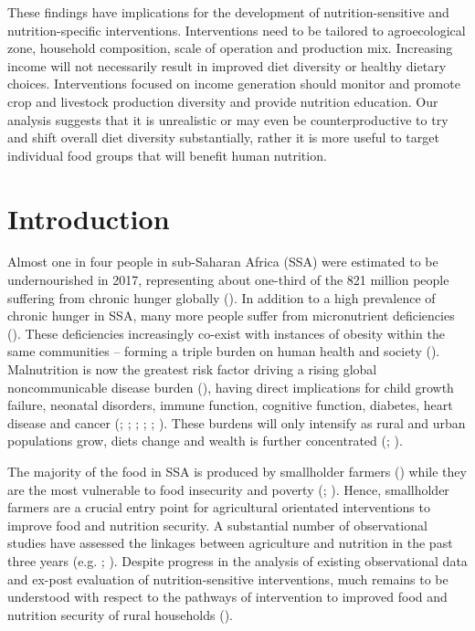 These findings have implications for the development of nutrition-sensitive and nutrition-specific interventions. Interventions need to be tailored to agroecological zone, household composition, scale of operation and production mix. Increasing income will not necessarily result in improved diet diversity or healthy dietary choices. Interventions focused on income generation should monitor and promote crop and livestock production diversity and provide nutrition education. Our analysis suggests that it is unrealistic or may even be counterproductive to try and shift overall diet diversity substantially, rather it is more useful to target individual food groups that will benefit human nutrition.

\newpage

\section{Introduction}

Almost one in four people in sub-Saharan Africa (SSA) were estimated to be undernourished in 2017, representing about one-third of the 821 million people suffering from chronic hunger globally (\citealp{FAO2018}). In addition to a high prevalence of chronic hunger in SSA, many more people suffer from micronutrient deficiencies (\citealp{Harika2017, Kumssa2015, Joy2014}). These deficiencies increasingly co-exist with instances of obesity within the same communities -- forming a triple burden on human health and society (\citealp{May2018}). Malnutrition is now the greatest risk factor driving a rising global noncommunicable  disease burden (\citealp{GBD2016RiskFactorsCollaborators2017}), having direct implications for child growth failure, neonatal disorders, immune function, cognitive function, diabetes, heart disease and cancer (\citealp{James2018}; \citealp{Prentice2018}; \citealp{DePee2017}; \citealp{Pisa2017}; \citealp{Akombi2017}; \citealp{Micha2015}). These burdens will only intensify as rural and urban populations grow, diets change and wealth is further concentrated (\citealp{FAO2018}; \citealp{Popkin2014}).

The majority of the food in SSA is produced by smallholder farmers (\citealp{Herrero2017}) while they are the most vulnerable to food insecurity and poverty (\citealp{Fanzo2018}; \citealp{Sibhatu2017}). Hence, smallholder farmers are a crucial entry point for agricultural orientated interventions to improve food and nutrition security. A substantial number of observational studies have assessed the linkages between agriculture and nutrition in the past three years (e.g. \citealp{Ruel2018}; \citealp{Gillespie2017}). Despite progress in the analysis of existing observational data and ex-post evaluation of nutrition-sensitive interventions, much remains to be understood with respect to the pathways of intervention to improved food and nutrition security of rural households (\citealp{Mary2018}).

